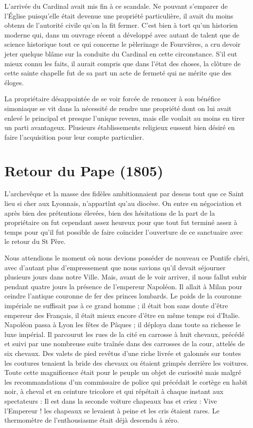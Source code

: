 \documentclass[11pt,a4paper]{report}
\begin{document}
L'arrivée du Cardinal avait mis fin à ce scandale. Ne pouvant s'emparer de l'Église puisqu'elle était devenue une propriété particulière, il avait du moins obtenu de l'autorité civile qu'on la fit fermer. C'est bien à tort qu'un historien moderne qui, dans un ouvrage récent a développé avec autant de talent que de science historique tout ce qui concerne le pèlerinage de Fourvières, a cru devoir jeter quelque blâme sur la conduite du Cardinal en cette circonstance. S'il eut mieux connu les faits, il aurait compris que dans l'état des choses, la clôture de cette sainte chapelle fut de sa part un acte de fermeté qui ne mérite que des éloges.

La propriétaire désappointée de se voir forcée de renoncer à son bénéfice simoniaque se vit dans la nécessité de rendre une propriété dont on lui avait enlevé le principal et presque l'unique revenu, mais elle voulait au moins en tirer un parti avantageux. Plusieurs établissements religieux eussent bien désiré en faire l'acquisition pour leur compte particulier.

\section*{Retour du Pape (1805)}

L'archevêque et la masse des fidèles ambitionnaient par dessus tout que ce Saint lieu si cher aux Lyonnais, n'appartînt qu'au diocèse. On entre en négociation et après bien des prétentions élevées, bien des hésitations de la part de la propriétaire on fut cependant assez heureux pour que tout fut terminé assez à temps pour qu'il fut possible de faire coïncider l'ouverture de ce sanctuaire avec le retour du St Père.

Nous attendions le moment où nous devions posséder de nouveau ce Pontife chéri, avec d'autant plus d'empressement que nous savions qu'il devait séjourner plusieurs jours dans notre Ville. Mais, avant de le voir arriver, il nous fallut subir pendant quatre jours la présence de l'empereur Napoléon. Il allait à Milan pour ceindre l'antique couronne de fer des princes lombards. Le poids de la couronne impériale ne suffisait pas à ce grand homme ; il était bon sans doute d'être empereur des Français, il était mieux encore d'être en même temps roi d'Italie. Napoléon passa à Lyon les fêtes de Pâques ; il déploya dans toute sa richesse le luxe impérial. Il parcourut les rues de la cité en carrosse à huit chevaux, précédé et suivi par une nombreuse suite traînée dans des carrosses de la cour, attelés de six chevaux. Des valets de pied revêtus d'une riche livrée et galonnés sur toutes les coutures tenaient la bride des chevaux ou étaient grimpés derrière les voitures. Toute cette magnificence était pour le peuple un objet de curiosité mais malgré les recommandations d'un commissaire de police qui précédait le cortège en habit noir, à cheval et en ceinture tricolore et qui répétait à chaque instant aux spectateurs : Il est dans la seconde voiture chapeaux bas et criez : Vive l'Empereur ! les chapeaux se levaient à peine et les cris étaient rares. Le thermomètre de l'enthousiasme était déjà descendu à zéro.
\end{document}
